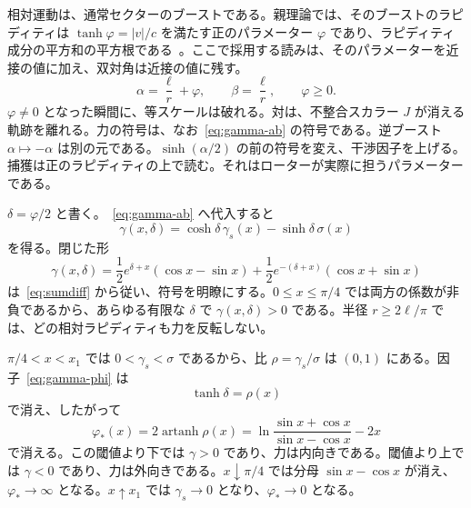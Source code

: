\documentclass[a4paper]{article}
\begin{document}
相対運動は、通常セクターのブーストである。親理論では、そのブーストのラピディティは \(\tanh\varphi=|v|/c\) を満たす正のパラメーター \(\varphi\) であり、ラピディティ成分の平方和の平方根である~\cite{dst-main}。ここで採用する読みは、そのパラメーターを近接の値に加え、双対角は近接の値に残す。
\begin{equation}
\label{eq:ansatz}
\alpha=\frac{\ell}{r}+\varphi,
\qquad
\beta=\frac{\ell}{r},
\qquad
\varphi\ge 0.
\end{equation}
\(\varphi\neq 0\) となった瞬間に、等スケールは破れる。対は、不整合スカラー \(J\) が消える軌跡を離れる。力の符号は、なお~\eqref{eq:gamma-ab} の符号である。逆ブースト \(\alpha\mapsto-\alpha\) は別の元である。\(\sinh(\alpha/2)\) の前の符号を変え、干渉因子を上げる。捕獲は正のラピディティの上で読む。それはローターが実際に担うパラメーターである。

\(\delta=\varphi/2\) と書く。~\eqref{eq:gamma-ab} へ代入すると
\begin{equation}
\label{eq:gamma-phi}
\gamma(x,\delta)
  =\cosh\delta\,\gamma_s(x)-\sinh\delta\,\sigma(x)
\end{equation}
を得る。閉じた形
\begin{equation}
\label{eq:gamma-closed}
\gamma(x,\delta)
  =\frac12 e^{\delta+x}(\cos x-\sin x)
  +\frac12 e^{-(\delta+x)}(\cos x+\sin x)
\end{equation}
は~\eqref{eq:sumdiff} から従い、符号を明瞭にする。\(0\le x\le\pi/4\) では両方の係数が非負であるから、あらゆる有限な \(\delta\) で \(\gamma(x,\delta)>0\) である。半径 \(r\ge 2\ell/\pi\) では、どの相対ラピディティも力を反転しない。

\(\pi/4<x<x_1\) では \(0<\gamma_s<\sigma\) であるから、比 \(\rho=\gamma_s/\sigma\) は \((0,1)\) にある。因子~\eqref{eq:gamma-phi} は
\[
\tanh\delta=\rho(x)
\]
で消え、したがって
\begin{equation}
\label{eq:phi-star}
\varphi_*(x)
  =2\operatorname{artanh}\rho(x)
  =\ln\frac{\sin x+\cos x}{\sin x-\cos x}-2x
\end{equation}
で消える。この閾値より下では \(\gamma>0\) であり、力は内向きである。閾値より上では \(\gamma<0\) であり、力は外向きである。\(x\downarrow\pi/4\) では分母 \(\sin x-\cos x\) が消え、\(\varphi_*\to\infty\) となる。\(x\uparrow x_1\) では \(\gamma_s\to 0\) となり、\(\varphi_*\to 0\) となる。
\end{document}
